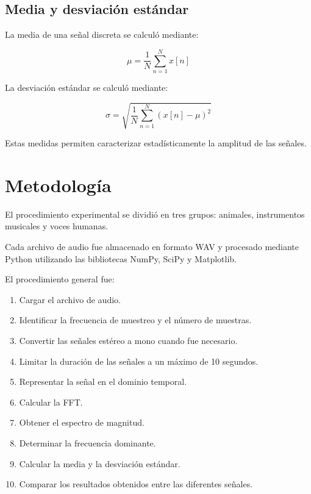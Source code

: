 \documentclass[conference]{IEEEtran}
\begin{document}
\subsection{Media y desviación estándar}

La media de una señal discreta se calculó mediante:

\begin{equation}
\mu =
\frac{1}{N}
\sum_{n=1}^{N}x[n]
\end{equation}

La desviación estándar se calculó mediante:

\begin{equation}
\sigma =
\sqrt{
\frac{1}{N}
\sum_{n=1}^{N}
(x[n]-\mu)^2
}
\end{equation}

Estas medidas permiten caracterizar estadísticamente la amplitud de las señales.



\section{Metodología}

El procedimiento experimental se dividió en tres grupos: animales, instrumentos musicales y voces humanas.

Cada archivo de audio fue almacenado en formato WAV y procesado mediante Python utilizando las bibliotecas NumPy, SciPy y Matplotlib.

El procedimiento general fue:

\begin{enumerate}

\item Cargar el archivo de audio.

\item Identificar la frecuencia de muestreo y el número de muestras.

\item Convertir las señales estéreo a mono cuando fue necesario.

\item Limitar la duración de las señales a un máximo de 10 segundos.

\item Representar la señal en el dominio temporal.

\item Calcular la FFT.

\item Obtener el espectro de magnitud.

\item Determinar la frecuencia dominante.

\item Calcular la media y la desviación estándar.

\item Comparar los resultados obtenidos entre las diferentes señales.

\end{enumerate}
\end{document}
